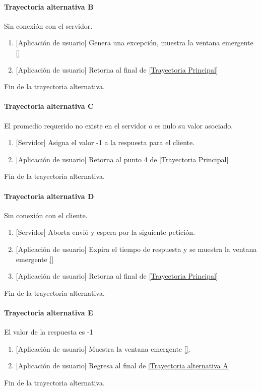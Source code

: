\paragraph{Trayectoria alternativa B} \label{SUB-M-CU5:TB}
	Sin conexión con el servidor.
	\begin{enumerate}[label=B\arabic*.]
		\item {[Aplicación de usuario]} Genera una excepción, muestra la ventana emergente \ref{} 
		\item {[Aplicación de usuario]} Retorna al final de \hyperref[SUB-M-CU6:TP]{[Trayectoria Principal]} 
	\end{enumerate}
	Fin de la trayectoria alternativa.

\paragraph{Trayectoria alternativa C} \label{SUB-M-CU6:TC}
	El promedio requerido no existe en el servidor o es nulo su valor asociado.
	\begin{enumerate}[label=C\arabic*.]
		\item {[Servidor]} Asigna el valor -1 a la respuesta para el cliente.
		\item {[Aplicación de usuario]} Retorna al punto 4 de \hyperref[SUB-M-CU6:TP]{[Trayectoria Principal]}
	\end{enumerate}
	Fin de la trayectoria alternativa.

\paragraph{Trayectoria alternativa D} \label{SUB-M-CU6:TD}
	Sin conexión con el cliente.
	\begin{enumerate}[label=D\arabic*.]
		\item {[Servidor]} Aborta envió y espera por la siguiente petición.
		\item {[Aplicación de usuario]} Expira el tiempo de respuesta y se muestra la ventana emergente \ref{} 
		\item {[Aplicación de usuario]} Retorna al final de \hyperref[SUB-M-CU6:TP]{[Trayectoria Principal]} 
	\end{enumerate}
	Fin de la trayectoria alternativa.
	
\paragraph{Trayectoria alternativa E} \label{SUB-M-CU6:TE}
	El valor de la respuesta es -1
	\begin{enumerate}[label=E\arabic*.]
		\item {[Aplicación de usuario]} Muestra la ventana emergente \ref{}.
		\item {[Aplicación de usuario]} Regresa al final de \hyperref[SUB-M-CU6:TA]{[Trayectoria alternativa A]}
	\end{enumerate}
	Fin de la trayectoria alternativa.